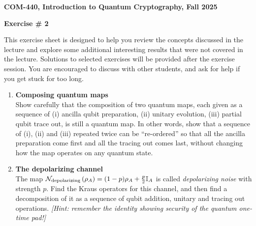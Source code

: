 \documentclass[12pt]{article}
\newcommand{\header}[1]{\begin{center} {\large\bf #1} \end{center}}
\begin{document}
\header{COM-440, Introduction to Quantum Cryptography, Fall 2025}
\header{\bf Exercise \# 2}

This exercise sheet is designed to help you review the concepts discussed in the lecture and explore some additional interesting results that were not covered in the lecture. Solutions to selected exercises will be provided after the exercise session. You are encouraged to discuss with other students, and ask for help if you get stuck for too long.

\begin{enumerate}

\item {\bf Composing quantum maps}\\
 Show carefully that the composition of two quantum maps, each given as a sequence of (i) ancilla qubit preparation, (ii) unitary evolution, (iii) partial qubit trace out, is still a quantum map. In other words, show that a sequence of (i), (ii) and (iii) repeated twice can be ``re-ordered'' so that all the ancilla preparation come first and all the tracing out comes last, without changing how the map operates on any quantum state. 

\item {\bf The depolarizing channel}\\
The map $\mathcal{N}_{\rm depolarizing}\left(\rho_A\right) = (1-p) \rho_A + \frac{p}{2}\mathbb{I}_A$ is called \emph{depolarizing noise} with strength $p$. Find the Kraus operators for this channel, and then  find a decomposition of it as a sequence of qubit addition, unitary and tracing out operations. \emph{[Hint: remember the identity showing security of the quantum one-time pad!]}



\end{enumerate}
\end{document}
